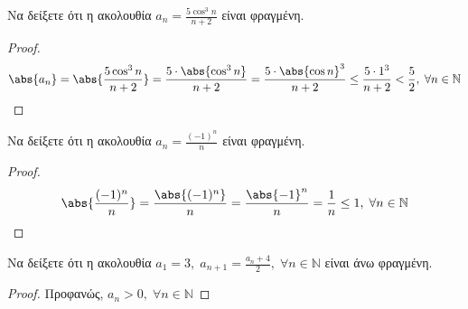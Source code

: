 \documentclass[a4paper,table]{report}
\begin{document}
\begin{enumerate}
  \item Να δείξετε ότι η ακολουθία $ a_{n} = \frac{5 \cos^{3}{n}}{n+2} $ 
    είναι φραγμένη.
    \begin{proof}
      \[
        \abs{a_{n}} = \abs{\frac{5 \cos^{3}{n}}{n+2}} = 
        \frac{5 \cdot \abs{\cos^{3}{n}}}{n+2} = \frac{5\cdot 
        \abs{\cos{n}}^ {3}}{n+2} \leq  \frac{5 \cdot 1^{3}}{n+2} < 
        \frac{5}{2}, \; \forall n \in \mathbb{N}
      \]
    \end{proof}




  \item Να δείξετε ότι η ακολουθία $ a_{n} = \frac{(-1)^{n}}{n} $ είναι 
    φραγμένη.
    \begin{proof}
      \[
        \abs{\frac{(-1)^{n}}{n}} = \frac{\abs{(-1)^{n}}}{n} = 
        \frac{\abs{-1}^{n}}{n} = \frac{1}{n} \leq 1, \; \forall n \in 
        \mathbb{N} 
      \] 
    \end{proof}



  \item Να δείξετε ότι η ακολουθία $ a_{1} = 3, \; a_{n+1} =
    \frac{a_{n}+4}{2}, \; \forall n \in \mathbb{N} $ είναι άνω φραγμένη.
    \begin{proof}
    \item {}
      Προφανώς, $ a_{n} > 0, \; \forall n \in \mathbb{N} $ 


\end{proof}
\end{enumerate}
\end{document}
